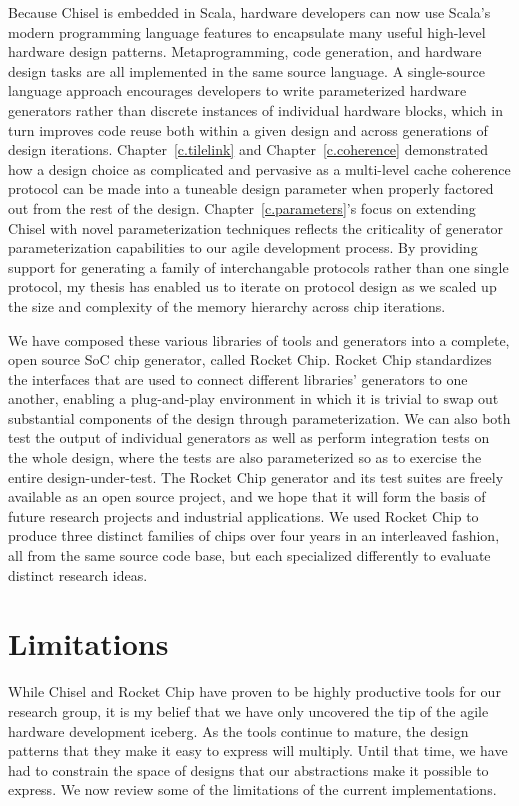 Because Chisel is embedded in Scala, hardware developers can now use Scala's modern programming language features to encapsulate many useful high-level hardware design patterns.
Metaprogramming, code generation, and hardware design tasks are all implemented in the same source language.
A single-source language approach encourages developers to write parameterized hardware generators rather than discrete instances of individual hardware blocks,
which in turn improves code reuse both within a given design and across generations of design iterations.
Chapter~\ref{c.tilelink} and Chapter~\ref{c.coherence} demonstrated how a design choice as complicated and pervasive as a multi-level cache coherence protocol can be made
into a tuneable design parameter when properly factored out from the rest of the design.
Chapter~\ref{c.parameters}'s focus on extending Chisel with novel parameterization techniques reflects the criticality of generator parameterization capabilities to our agile development process.
By providing support for generating a family of interchangable protocols rather than one single protocol, my thesis has enabled us to iterate on protocol design as we scaled up the size and complexity of the memory hierarchy across chip iterations.

We have composed these various libraries of tools and generators into a complete, open source SoC chip generator, called Rocket Chip.
Rocket Chip  standardizes the interfaces that are used
to connect different libraries' generators to one another, enabling
a plug-and-play environment in which it is trivial to swap out
substantial components of the design through parameterization.
We can also both test the output of individual generators as well as perform
integration tests on the whole design, where the tests are also
parameterized so as to exercise the entire design-under-test.
The Rocket Chip generator and its test suites are freely available as an open source project,
and we hope that it will form the basis of future research projects and industrial applications.
We used Rocket Chip to produce three distinct families of chips over four years in an interleaved fashion, 
all from the same source code base, but each specialized differently to evaluate distinct research ideas.

\section{Limitations}

While Chisel and Rocket Chip have proven to be highly productive tools for our research group,
it is my belief that we have only uncovered the tip of the agile hardware development iceberg.
As the tools continue to mature, the design patterns that they make it easy to express will multiply.
Until that time, we have had to constrain the space of designs that our abstractions make it possible to express.
We now review some of the limitations of the current implementations.

